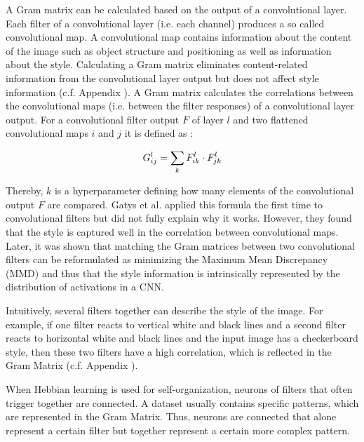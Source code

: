 A Gram matrix can be calculated based on the output of a convolutional layer.
Each filter of a convolutional layer (i.e. each channel) produces a so called convolutional map.
A convolutional map contains information about the content of the image such as object structure and positioning as well as information about the style.
Calculating a Gram matrix eliminates content-related information from the convolutional layer output but does not affect style information (c.f. Appendix ).
A Gram matrix calculates the correlations between the convolutional maps (i.e. between the filter responses) of a convolutional layer output.
For a convolutional filter output $F$ of layer $l$ and two flattened convolutional maps $i$ and $j$ it is defined as :

\begin{equation}\eqlbl{Gram_mat}
		G_{ij}^{l} = \sum_k F^{l}_{ik} \cdot F^{l}_{jk}
\end{equation}%

Thereby, $k$ is a hyperparameter defining how many elements of the convolutional output $F$ are compared.
Gatys et al.  applied this formula the first time to convolutional filters but did not fully explain why it works.
However, they found that the style is captured well in the correlation between convolutional maps.
Later, it was shown  that matching the Gram matrices between two convolutional filters can be reformulated as minimizing the Maximum Mean Discrepancy (MMD)  and thus that the style information is intrinsically represented by the distribution of activations in a CNN.

Intuitively, several filters together can describe the style of the image.
For example, if one filter reacts to vertical white and black lines and a second filter reacts to horizontal white and black lines and the input image has a checkerboard style, then these two filters have a high correlation, which is reflected in the Gram Matrix (c.f. Appendix ).

When Hebbian learning is used for self-organization, neurons of filters that often trigger together are connected.
A dataset usually contains specific patterns, which are represented in the Gram Matrix.
Thus, neurons are connected that alone represent a certain filter but together represent a certain more complex pattern.


